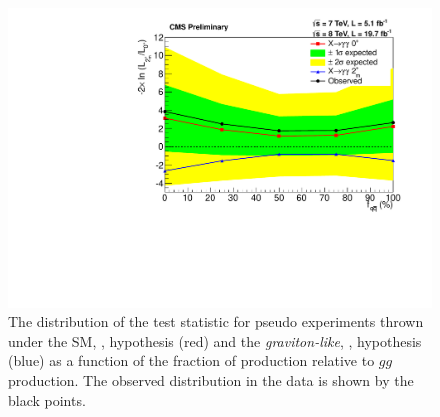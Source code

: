 \begin{figure}
  \begin{center}
    \includegraphics[width=0.8\linewidth]{spin/plots/fqqbar_unblind.pdf}
    \caption[Distribution of the test statistic as a function of \fqqbar for the spin analysis]{The distribution of the test statistic for pseudo experiments thrown under the SM, \zerop, hypothesis (red) and the \emph{graviton-like}, \twomp, hypothesis (blue) as a function of the fraction of \qqbar production relative to $gg$ production. The observed distribution in the data is shown by the black points.}
    \label{fig:qqbar}
  \end{center}
\end{figure}



